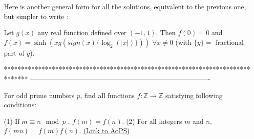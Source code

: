 \begin{solution}
	Here is another general form for all the solutions, equivalent to the previous one, but simpler to write :

Let $ g(x)$ any real function defined over $ (-1,1)$. Then $ f(0)=0$ and $ f(x)=\sinh(x g(sign(x)\{\log_2(|x|)\}))$ $ \forall x\neq 0$ (with $ \{y\}=$ fractional part of $ y$).
\end{solution}
*******************************************************************************
-------------------------------------------------------------------------------

\begin{problem}
	For odd prime numbers $ p$, find all functions $ f: \mathbb{Z}\rightarrow\mathbb{Z}$ satisfying following conditions:

(1) If $ m\equiv n\mod p$ , $ f(m)=f(n)$.
(2) For all integers $ m$ and $ n$, $ f(mn)=f(m)f(n)$.
	\flushright \href{https://artofproblemsolving.com/community/c6h275931}{(Link to AoPS)}
\end{problem}




